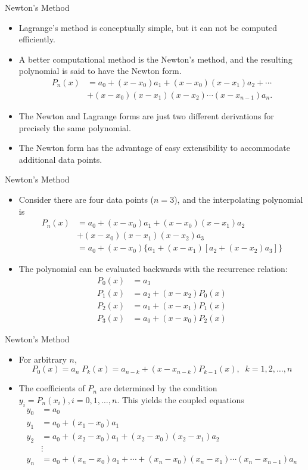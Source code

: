 \documentclass{beamer}
\begin{document}
\begin{frame}{Newton's Method}
\begin{itemize}
\item Lagrange's method is conceptually simple, but it can not be computed  efficiently.
\item A better computational method is the \alert{Newton's method}, and the resulting polynomial is said to have the \alert{Newton form}.
\begin{align*}
P_n(x)&=a_0+(x-x_0)a_1+(x-x_0)(x-x_1)a_2 + \cdots\\
&+(x-x_0)(x-x_1)(x-x_2)\cdots (x-x_{n-1})a_n. 
\end{align*}
\item  The Newton and Lagrange forms are just two different derivations for precisely the \alert{same polynomial}. 
\item The Newton form has the advantage of easy extensibility to accommodate additional data points.

\end{itemize}
\end{frame}


\begin{frame}{Newton's Method}
\begin{itemize}
\item Consider there are four data points  ($n=3$), and the interpolating polynomial is 
\begin{align*}
P_n(x)&=a_0+(x-x_0)a_1+(x-x_0)(x-x_1)a_2 \\
&+ (x-x_0)(x-x_1)(x-x_2)a_3 \\
&= a_0 +(x-x_0) \{ a_1 +(x-x_1) [a_2+(x-x_2)a_3]\} 
\end{align*}
\item The polynomial can be evaluated backwards with the recurrence relation:
\begin{align*}
P_0(x)&=a_3\\
P_1(x)&=a_2+(x-x_2)P_0(x)\\
P_2(x)&=a_1+(x-x_1)P_1(x)\\
P_3(x)&=a_0+(x-x_0)P_2(x)
\end{align*}
\end{itemize}
\end{frame}
\begin{frame}{Newton's Method}
\begin{itemize}
\item For arbitrary $n$, 
\[
P_0(x)=a_n\; P_k(x)=a_{n-k}+ (x-x_{n-k})P_{k-1}(x), \;\; k=1,2,\ldots,n
\]
\item The coefficients of $P_n$ are determined by the condition $y_i=P_n(x_i), i=0, 1, \ldots,n$. This yields the coupled equations
\begin{align*}
y_0&=a_0\\
y_1&=a_0+(x_1-x_0)a_1\\
y_2&=a_0+(x_2-x_0)a_1+(x_2-x_0)(x_2-x_1)a_2\\
& \vdots\\
y_n&=a_0+(x_n-x_0)a_1+\cdots+(x_n-x_0)(x_n-x_1)\cdots(x_n-x_{n-1})a_n
\end{align*}
\end{itemize}
\end{frame}
\end{document}
